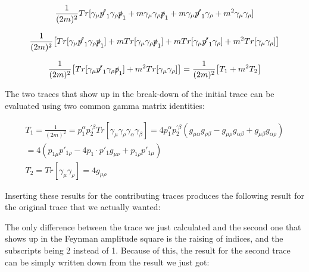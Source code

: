 \documentclass[a4]{article}
\begin{document}
    \begin{equation}
        \frac{1}{(2m)^2} Tr[\gamma_\mu \slashed{p'}_1 \gamma_\rho \slashed{p}_1 + m \gamma_\mu \gamma_\rho \slashed{p}_1 + m \gamma_\mu \slashed{p'}_1 \gamma_\rho + m^2 \gamma_\mu \gamma_\rho]
    \end{equation}

    \begin{equation}
        \frac{1}{(2m)^2} \big[ Tr[\gamma_\mu \slashed{p'}_1 \gamma_\rho \slashed{p}_1] + m Tr[\gamma_\mu \gamma_\rho \slashed{p}_1] + m Tr[\gamma_\mu \slashed{p'}_1 \gamma_\rho] + m^2 Tr[\gamma_\mu \gamma_\rho] \big]
    \end{equation}

    \begin{equation}
        \frac{1}{(2m)^2} \big[ Tr[\gamma_\mu \slashed{p'}_1 \gamma_\rho \slashed{p}_1] + m^2 Tr[\gamma_\mu \gamma_\rho] \big] = \frac{1}{(2m)^2} \big[ T_1 + m^2 T_2 \big]
    \end{equation}

    The two traces that show up in the break-down of the initial trace can be evaluated using two common gamma matrix identities:

    \begin{eqnarray}
        T_1 = \frac{1}{(2m)^2} = p_1^{\alpha} p_2^{'\beta} Tr [\gamma_\mu \gamma_\rho \gamma_\alpha \gamma_\beta] = 4 p_1^{\alpha} p_2^{'\beta} (g_{\mu \alpha} g_{\rho \beta} - g_{\mu \rho} g_{\alpha \beta} + g_{\mu \beta} g_{\alpha \rho}) \\
        = 4 (p_{1 \mu} p'_{1 \rho} - 4 p_1 \cdot p'_1 g_{\mu \nu} + p_{1 \rho} p'_{1 \mu}) \\ 
        T_2 = Tr [\gamma_\mu \gamma_\rho] = 4 g_{\mu \rho}
    \end{eqnarray}

    Inserting these results for the contributing traces produces the following result for the original trace that we actually wanted:

    \begin{center}
    \end{center}

    The only difference between the trace we just calculated and the second one that shows up in the Feynman amplitude square is the raising of indices, and the subscripts being 2 instead of 1. Because of this, the result for the second trace can be
    simply written down from the result we just got:
\end{document}
